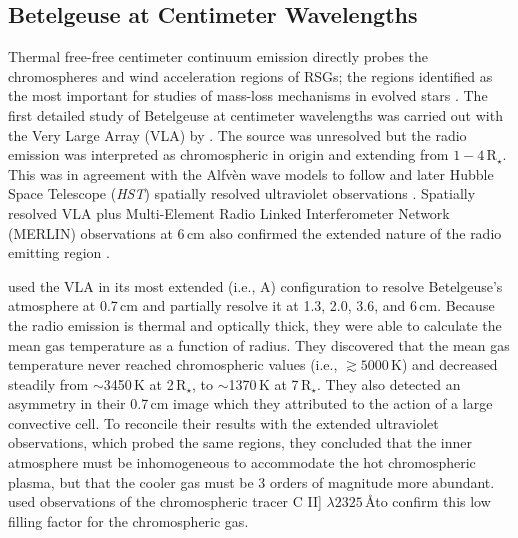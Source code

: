 \documentclass[iop]{emulateapj}
\begin{document}
\subsection{Betelgeuse at Centimeter Wavelengths}
Thermal free-free centimeter continuum emission directly probes the chromospheres and wind acceleration regions of RSGs; the regions identified as the most important for studies of mass-loss mechanisms in evolved stars \citep{holzer_1985}.  The first detailed study of Betelgeuse at centimeter wavelengths was carried out with the Very Large Array (VLA) by \cite{newell_1982}. The source was unresolved but the radio emission was interpreted as chromospheric in origin and extending from $1-4$\,R$_{\star}$. This was in agreement with the Alfv\`en wave models to follow \citep{hartmann_1984} and later Hubble Space Telescope (\textit{HST}) spatially resolved ultraviolet observations \citep{gilliland_1996,uitenbroek_1998}. Spatially resolved VLA plus Multi-Element Radio Linked Interferometer Network (MERLIN) observations at 6\,cm also confirmed the extended nature of the radio emitting region \citep{skinner_1997}. 

\cite{lim_1998} used the VLA in its most extended (i.e., A) configuration to resolve Betelgeuse's atmosphere at 0.7\,cm and partially resolve it at 1.3, 2.0, 3.6, and 6\,cm. Because the radio emission is thermal and optically thick, they were able to calculate the mean gas temperature as a function of radius. They discovered that the mean gas temperature never reached chromospheric values (i.e., $\gtrsim 5000\,$K) and decreased steadily from $\sim$3450\,K at 2\,R$_{\star}$, to $\sim$1370\,K at 7\,R$_{\star}$. They also detected an asymmetry in their 0.7\,cm image which they attributed to the action of a large convective cell. To reconcile their results with the extended ultraviolet observations, which probed the same regions, they concluded that the inner atmosphere must be inhomogeneous to accommodate the hot chromospheric plasma, but that the cooler gas must be 3 orders of magnitude more abundant. \cite{harper_2006} used observations of the chromospheric tracer C II] $\lambda 2325\,$\AA to confirm this low filling factor for the chromospheric gas. 
\end{document}
